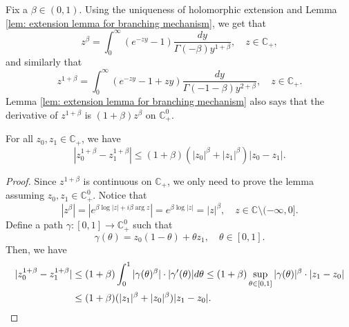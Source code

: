 \documentclass[EJP]{ejpecp} %
\begin{document}
	Fix a $\beta \in (0,1)$.
	Using the uniqueness of holomorphic extension and Lemma \ref{lem: extension lemma for branching mechanism}, we get that
\[
	z^{\beta}
	= \int_0^\infty (e^{-zy}-1) \frac{dy}{\Gamma(-\beta)y^{1+\beta}},
  	\quad z\in \mathbb C_+,
\]
	and similarly that
\begin{equation}
\label{eq: stable branching on C+}
  	z^{1+\beta}
  	= \int_0^\infty (e^{-zy}-1+zy)\frac{dy}{\Gamma(-1-\beta)y^{2+\beta}},
  	\quad z\in \mathbb C_+.
\end{equation}
	Lemma \ref{lem: extension lemma for branching mechanism} also says that the derivative of $z^{1+\beta}$ is $(1+\beta)z^{\beta}$ on $\mathbb C^0_+$.

\begin{lemma}
\label{lem: Lip of power function}
	For all $z_0,z_1 \in \mathbb C_+$, we have
\begin{equation}
	\label{eq: Lip of power function}
	|z_0^{1+\beta} - z_1^{1+\beta}|
	\leq (1+\beta)(|z_0|^{\beta}+|z_1|^{\beta})|z_0 - z_1|.
\end{equation}
\end{lemma}

\begin{proof}
	Since $z^{1+\beta}$ is continuous on $\mathbb C_+$, we only need to prove the lemma assuming $z_0,z_1 \in \mathbb C^0_+$.
	Notice that
\begin{equation}
\label{eq: upper bound for beta power of z}
    |z^\beta|
    = |e^{\beta \log |z| +i\beta \operatorname {arg}z}| = e^{\beta \log |z|} = |z|^\beta,
    \quad z \in \mathbb C\setminus (-\infty, 0].
\end{equation}
Define a path $\gamma: [0,1] \to \mathbb C^0_+$ such that
\[
    \gamma(\theta)
    = z_0 (1-\theta) + \theta z_1,
    \quad \theta \in [0,1].
\]
	Then, we have
\begin{align}
    |z_0^{1+\beta} - z_1^{1+\beta}|
    & \leq (1+\beta) \int_0^1 |\gamma(\theta)^{\beta}|\cdot |\gamma'(\theta)|d\theta
   	\leq (1+\beta)  \sup_{\theta \in [0,1]} |\gamma(\theta)|^{\beta} \cdot |z_1-z_0| \\
    & \leq (1+\beta)  ( |z_1|^{\beta}+|z_0|^{\beta} ) |z_1-z_0|.
\qedhere
\end{align}
\end{proof}
\end{document}
